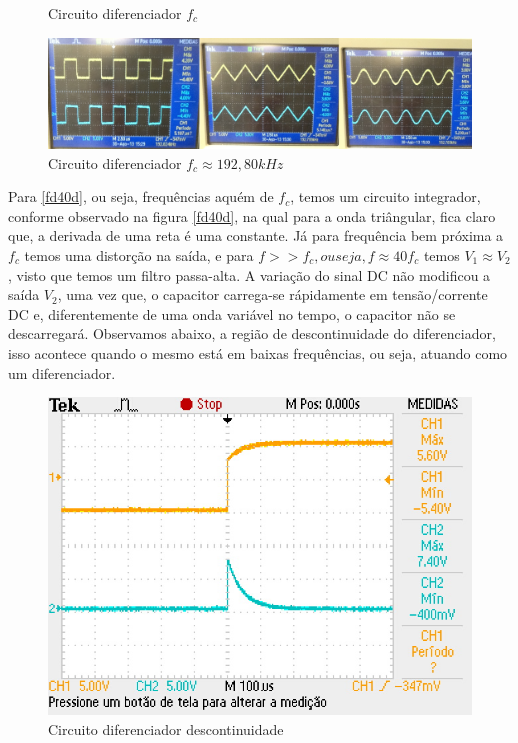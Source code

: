 \documentclass[12pt,letterpaper]{article}
\begin{document}
\begin{enumerate}[I]
\begin{figure}[!htb]
  \caption{Circuito diferenciador $f_c$}
\end{figure}
\begin{figure}[!htb]
  \centering
  \label{f40d}
  \includegraphics[scale=0.25]{img/f40d.jpg}
  \caption{Circuito diferenciador $f_c \approx 192,80kHz$}
\end{figure}
Para \ref{fd40d}, ou seja, frequências aquém de $f_c$, temos um circuito integrador, conforme observado na figura \ref{fd40d}, na qual para a onda triângular, fica claro que, a derivada de uma reta é uma constante. Já para frequência bem próxima a $f_c$ temos uma distorção na saída, e para $f >> f_c, ou seja, f \approx 40f_c$ temos $V_1 \approx V_2$, visto que temos um filtro passa-alta. 
A variação do sinal DC não modificou a saída $V_2$, uma vez que, o capacitor carrega-se rápidamente em tensão/corrente DC e, diferentemente de uma onda variável no tempo, o capacitor não se descarregará.
Observamos abaixo, a região de descontinuidade do diferenciador, isso acontece quando o mesmo está em baixas frequências, ou seja, atuando como um diferenciador.
\begin{figure}[!htb]
  \centering
  \label{decont}
  \includegraphics[scale=0.5]{img/descontinuidade.jpg}
  \caption{Circuito diferenciador descontinuidade}
\end{figure}
\end{enumerate}
\end{document}

